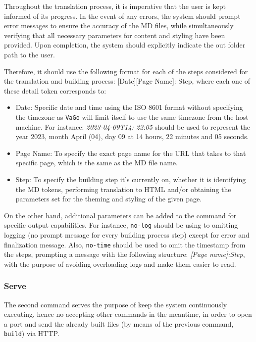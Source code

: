 Throughout the translation process, it is imperative that the user is
kept informed of its progress. In the event of any errors, the system
should prompt error messages to ensure the accuracy of the MD files,
while simultaneously verifying that all necessary parameters for content
and styling have been provided. Upon completion, the system should
explicitly indicate the out folder path to the user.

Therefore, it should use the following format for each of the steps
considered for the translation and building process: {[}Date{]}{[}Page
Name{]}: Step, where each one of these detail token corresponds to:

\begin{itemize}
    \item
    Date: Specific date and time using the ISO 8601 format\cite{wikiiso} without specifying
    the timezone as \texttt{VaGo} will limit itself to use the same
    timezone from the host machine. For instance: \emph{2023-04-09T14:
    22:05} should be used to represent the year 2023, month April (04),
    day 09 at 14 hours, 22 minutes and 05 seconds.
    \item
    Page Name: To specify the exact page name for the URL that takes to
    that specific page, which is the same as the MD file name.
    \item
    Step: To specify the building step it's currently on, whether it is
    identifying the MD tokens\cite{schutze2008introduction, wikilexical}, performing translation to HTML and/or
    obtaining the parameters set for the theming and styling of the given
    page.
\end{itemize}

On the other hand, additional parameters can be added to the command for
specific output capabilities. For instance, \texttt{no-log} should be
using to omitting logging (no prompt message for every building process
step) except for error and finalization message. Also, \texttt{no-time}
should be used to omit the timestamp from the steps, prompting a message
with the following structure: \emph{{[}Page name{]}:Step}, with the
purpose of avoiding overloading logs and make them easier to read.

\subsubsection{Serve}\label{subsubsec:serve}

The second command serves the purpose of keep the system continuously
executing, hence no accepting other commands in the meantime, in order
to open a port and send the already built files (by means of the
previous command, \texttt{build}) via HTTP\cite{gourley2002http}.

